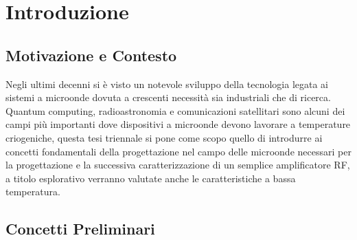 \documentclass[12pt]{article}
\begin{document}
\section{Introduzione}
\subsection{Motivazione e Contesto}
Negli ultimi decenni si è visto un notevole sviluppo della tecnologia legata ai sistemi a microonde dovuta a crescenti necessità sia industriali che di ricerca.
Quantum computing, radioastronomia e comunicazioni satellitari sono alcuni dei campi più importanti dove dispositivi a microonde devono lavorare a temperature
criogeniche, questa tesi triennale si pone come scopo quello di introdurre ai concetti fondamentali della progettazione nel campo delle microonde necessari per
la progettazione e la successiva caratterizzazione di un semplice amplificatore RF, a titolo esplorativo verranno valutate anche le caratteristiche a bassa
temperatura.

\subsection{Concetti Preliminari}
\end{document}
